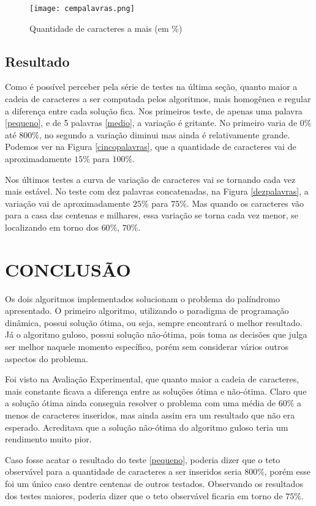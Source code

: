 \documentclass[12pt]{article}
\begin{document}
    \begin{figure}[h!]
        \centering
        \texttt{[image: cempalavras.png]}
        \caption{Quantidade de caracteres a mais (em \%)}
        \label{cempalavras}
    \end{figure}

\subsection{Resultado}

	Como é possível perceber pela série de testes na última seção, quanto maior a cadeia de caracteres a ser computada pelos algoritmos, mais homogênea e regular a diferença entre cada solução fica. Nos primeiros teste, de apenas uma palavra \ref{pequeno}, e de 5 palavras \ref{medio}, a variação é gritante. No primeiro varia de $0\%$ até $800\%$, no segundo a variação diminui mas ainda é relativamente grande. Podemos ver na Figura \ref{cincopalavras}, que a quantidade de caracteres vai de aproximadamente $15\%$ para $100\%$.

	Nos últimos testes a curva de variação de caracteres vai se tornando cada vez mais estável. No teste com dez palavras concatenadas, na Figura \ref{dezpalavras}, a variação vai de aproximadamente $25\%$ para $75\%$. Mas quando os caracteres vão para a casa das centenas e milhares, essa variação se torna cada vez menor, se localizando em torno dos $60\%$, $70\%$.


\section{CONCLUSÃO}
\label{conclusao}

    Os dois algoritmos implementados solucionam o problema do palíndromo apresentado. O primeiro algoritmo, utilizando o paradigma de programação dinâmica, possui solução ótima, ou seja, sempre encontrará o melhor resultado. Já o algoritmo guloso, possui solução não-ótima, pois toma as decisões que julga ser melhor naquele momento específico, porém sem considerar vários outros aspectos do problema.

    Foi visto na Avaliação Experimental, que quanto maior a cadeia de caracteres, mais constante ficava a diferença entre as soluções ótima e não-ótima. Claro que a solução ótima ainda conseguia resolver o problema com uma média de $60\%$ a menos de caracteres inseridos, mas ainda assim era um resultado que não era esperado. Acreditava que a solução não-ótima do algoritmo guloso teria um rendimento muito pior.

    Caso fosse acatar o resultado do teste \ref{pequeno}, poderia dizer que o teto observável para a quantidade de caracteres a ser inseridos seria $800\%$, porém esse foi um único caso dentre centenas de outros testados. Observando os resultados dos testes maiores, poderia dizer que o teto observável ficaria em torno de $75\%$.



\end{document}
